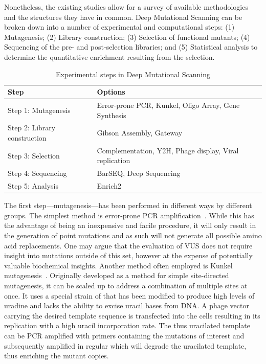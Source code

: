 Nonetheless, the existing studies allow for a survey of available methodologies and the structures they have in common. Deep Mutational Scanning can be broken down into a number of experimental and computational steps: (1) Mutagenesis; (2) Library construction; (3) Selection of functional mutants; (4) Sequencing of the pre- and post-selection libraries; and (5) Statistical analysis to determine the quantitative enrichment resulting from the selection. 

\begin{table}
	\centering
	\caption{Experimental steps in Deep Mutational Scanning}
	\label{table:DMSphases}
	\begin{tabular}{l p{10cm}}
	\textbf{Step}                & \textbf{Options} \\ \hline \hline
	Step 1: Mutagenesis          & Error-prone PCR, Kunkel, Oligo Array, Gene Synthesis\\ 
	Step 2: Library construction & Gibson Assembly, Gateway\\ 
	Step 3: Selection            & Complementation, Y2H, Phage display, Viral replication\\ 
	Step 4: Sequencing           & BarSEQ, Deep Sequencing\\ 
	Step 5: Analysis             & Enrich2\\ 
	\end{tabular}
\end{table}

The first step---mutagenesis---has been performed in different ways by different groups. The simplest method is error-prone PCR amplification~\cite{firstErrorPronePCR,mohan_pcr_2011}. While this has the advantage of being an inexpensive and facile procedure, it will only result in the generation of point mutations and as such will not generate all possible amino acid replacements. One may argue that the evaluation of VUS does not require insight into mutations outside of this set, however at the expense of potentially valuable biochemical insights. Another method often employed is Kunkel mutagenesis~\cite{kunkel_rapid_1985}. Originally developed as a method for simple site-directed mutagenesis, it can be scaled up to address a combination of multiple sites at once. It uses a special strain of  that has been modified to produce high levels of uradine and lacks the ability to excise uracil bases from DNA. A phage vector carrying the desired template sequence is transfected into the cells resulting in its replication with a high uracil incorporation rate. The thus uracilated template can be PCR amplified with primers containing the mutations of interest and subsequently amplified in regular  which will degrade the uracilated template, thus enriching the mutant copies. 

